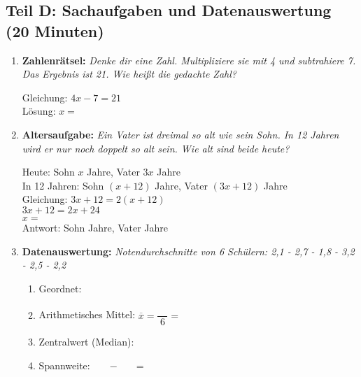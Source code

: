 \subsection*{Teil D: Sachaufgaben und Datenauswertung (20 Minuten)}

\begin{enumerate}[label=\arabic*.]

    \item \textbf{Zahlenrätsel:}
    \textit{Denke dir eine Zahl. Multipliziere sie mit 4 und subtrahiere 7. Das Ergebnis ist 21. Wie heißt die gedachte Zahl?}
    \vspace{0.5cm}

    Gleichung: $4x - 7 = 21$ \\
    Lösung: $x = \phantom{00}$

    \vspace{1cm}

    \item \textbf{Altersaufgabe:}
    \textit{Ein Vater ist dreimal so alt wie sein Sohn. In 12 Jahren wird er nur noch doppelt so alt sein. Wie alt sind beide heute?}
    \vspace{0.5cm}

    Heute: Sohn $x$ Jahre, Vater $3x$ Jahre \\
    In 12 Jahren: Sohn $(x + 12)$ Jahre, Vater $(3x + 12)$ Jahre \\
    Gleichung: $3x + 12 = 2(x + 12)$ \\
    $3x + 12 = 2x + 24$ \\
    $x = \phantom{00}$ \\
    Antwort: Sohn \underline{\hspace{1cm}} Jahre, Vater \underline{\hspace{1cm}} Jahre

    \vspace{1cm}

    \item \textbf{Datenauswertung:}
    \textit{Notendurchschnitte von 6 Schülern: 2,1 - 2,7 - 1,8 - 3,2 - 2,5 - 2,2}
    \vspace{0.5cm}

    \begin{enumerate}[label=\alph*)]
        \item Geordnet: \underline{\hspace{6cm}}
        \vspace{0.3cm}

        \item Arithmetisches Mittel: $\overline{x} = \dfrac{\phantom{00}}{6} = \phantom{0,0}$
        \vspace{0.3cm}

        \item Zentralwert (Median): \underline{\hspace{2cm}}
        \vspace{0.3cm}

        \item Spannweite: $\phantom{0,0} - \phantom{0,0} = \phantom{0,0}$
    \end{enumerate}

\end{enumerate}